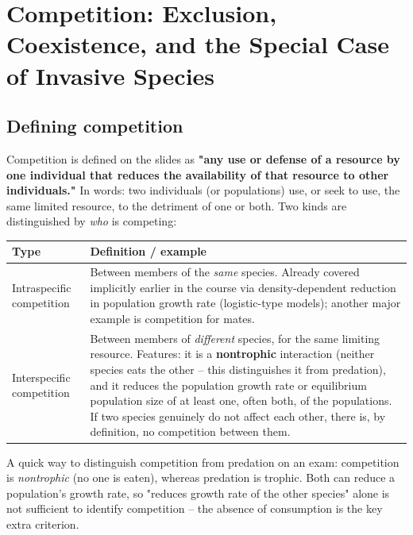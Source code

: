 \documentclass[11pt,a4paper]{article}
\begin{document}
\newpage

\section{Competition: Exclusion, Coexistence, and the Special Case of Invasive Species}

\subsection{Defining competition}
Competition is defined on the slides as \textbf{"any use or defense of a resource by one individual that reduces the availability of that resource to other individuals."} In words: two individuals (or populations) use, or seek to use, the same limited resource, to the detriment of one or both. Two kinds are distinguished by \emph{who} is competing:

\begin{center}
\begin{tabularx}{\textwidth}{@{}l X@{}}
\toprule
\textbf{Type} & \textbf{Definition / example} \\
\midrule
Intraspecific competition & Between members of the \emph{same} species. Already covered implicitly earlier in the course via density-dependent reduction in population growth rate (logistic-type models); another major example is competition for mates. \\
Interspecific competition & Between members of \emph{different} species, for the same limiting resource. Features: it is a \textbf{nontrophic} interaction (neither species eats the other -- this distinguishes it from predation), and it reduces the population growth rate or equilibrium population size of at least one, often both, of the populations. If two species genuinely do not affect each other, there is, by definition, no competition between them. \\
\bottomrule
\end{tabularx}
\end{center}

\begin{exambox}
A quick way to distinguish competition from predation on an exam: competition is \emph{nontrophic} (no one is eaten), whereas predation is trophic. Both can reduce a population's growth rate, so "reduces growth rate of the other species" alone is not sufficient to identify competition -- the absence of consumption is the key extra criterion.
\end{exambox}
\end{document}
